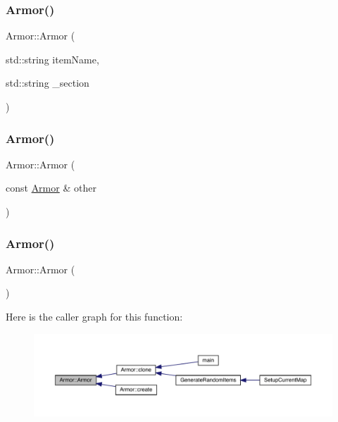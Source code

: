 \mbox{\label{class_armor_a1a1bc35d82ebba3f5a81f9e40d93f3c9}} 
\subsubsection{\texorpdfstring{Armor()}{Armor()}\hspace{0.1cm}{\footnotesize\ttfamily [3/5]}}
{\footnotesize\ttfamily Armor\+::\+Armor (\begin{DoxyParamCaption}\item[{std\+::string}]{item\+Name,  }\item[{std\+::string}]{\+\_\+section }\end{DoxyParamCaption})}

\mbox{\label{class_armor_a40d54a621183a93edaecb2cd4e83c800}} 
\subsubsection{\texorpdfstring{Armor()}{Armor()}\hspace{0.1cm}{\footnotesize\ttfamily [4/5]}}
{\footnotesize\ttfamily Armor\+::\+Armor (\begin{DoxyParamCaption}\item[{const \mbox{\hyperlink{class_armor}{Armor}} \&}]{other }\end{DoxyParamCaption})}

\mbox{\label{class_armor_a23323e95bbeb488eb6fe54cbd83d49a2}} 
\subsubsection{\texorpdfstring{Armor()}{Armor()}\hspace{0.1cm}{\footnotesize\ttfamily [5/5]}}
{\footnotesize\ttfamily Armor\+::\+Armor (\begin{DoxyParamCaption}{ }\end{DoxyParamCaption})}

Here is the caller graph for this function\+:
\nopagebreak
\begin{figure}[H]
\begin{center}
\leavevmode
\includegraphics[width=350pt]{class_armor_a23323e95bbeb488eb6fe54cbd83d49a2_icgraph}
\end{center}
\end{figure}
\mbox{\label{class_armor_a1cb22d4e87d0ec24a30de40873632945}} 
